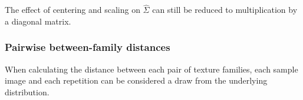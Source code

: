 \documentclass[
  10pt,
  letterpaper,
  DIV=11,
  numbers=noendperiod]{scrartcl}
\begin{document}
The effect of centering and scaling on \(\hat\Sigma\) can still be
reduced to multiplication by a diagonal matrix.

\subsubsection{Pairwise between-family
distances}\label{pairwise-between-family-distances}

When calculating the distance between each pair of texture families,
each sample image and each repetition can be considered a draw from the
underlying distribution.
\end{document}
